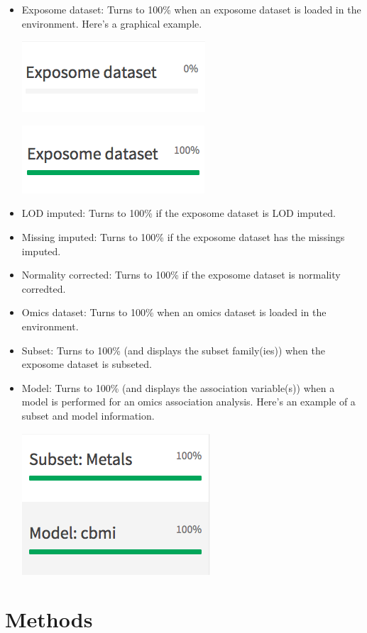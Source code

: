 \documentclass[
]{book}
\providecommand{\tightlist}{%
  \setlength{\itemsep}{0pt}\setlength{\parskip}{0pt}}
\begin{document}
\begin{itemize}
\tightlist
\item
  Exposome dataset: Turns to 100\% when an exposome dataset is loaded in the environment. Here's a graphical example.

  \includegraphics{images/general2.png}

  \includegraphics{images/general3.png}
\item
  LOD imputed: Turns to 100\% if the exposome dataset is LOD imputed.
\item
  Missing imputed: Turns to 100\% if the exposome dataset has the missings imputed.
\item
  Normality corrected: Turns to 100\% if the exposome dataset is normality corredted.
\item
  Omics dataset: Turns to 100\% when an omics dataset is loaded in the environment.
\item
  Subset: Turns to 100\% (and displays the subset family(ies)) when the exposome dataset is subseted.
\item
  Model: Turns to 100\% (and displays the association variable(s)) when a model is performed for an omics association analysis. Here's an example of a subset and model information.

  \includegraphics{images/general4.png}
\end{itemize}

\hypertarget{methods}{%
\chapter{Methods}\label{methods}}
\end{document}
